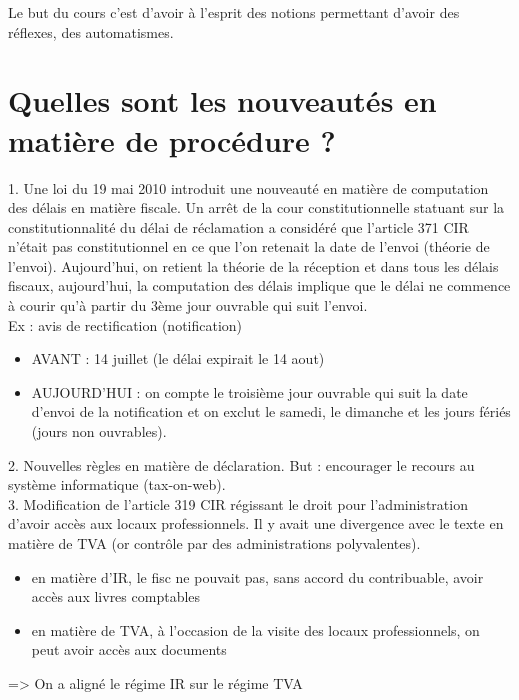 \documentclass{book}
\begin{document}
Le but du cours c’est d’avoir à l’esprit des notions permettant d’avoir des réflexes, des automatismes. \\

\section*{Quelles sont les nouveautés en matière de procédure ?}

1. Une loi du 19 mai 2010 introduit une nouveauté en matière de computation des délais en matière fiscale. Un arrêt de la cour constitutionnelle statuant sur la constitutionnalité du délai de réclamation a considéré que l’article 371 CIR n’était pas constitutionnel en ce que l’on retenait la date de l’envoi (théorie de l’envoi). Aujourd’hui, on retient la théorie de la réception et dans tous les délais fiscaux, aujourd’hui, la computation des délais implique que le délai ne commence à courir qu’à partir du 3ème jour ouvrable qui suit l’envoi. \\

Ex : avis de rectification (notification)
\begin{itemize}
\item AVANT : 14 juillet (le délai expirait le 14 aout)
\item AUJOURD’HUI : on compte le troisième jour ouvrable qui suit la date d’envoi de la notification et on exclut le samedi, le dimanche et les jours fériés (jours non ouvrables). 
\end{itemize}

2. Nouvelles règles en matière de déclaration. But : encourager le recours au système informatique (tax-on-web). \\

3. Modification de l’article 319 CIR régissant le droit pour l’administration d’avoir accès aux locaux professionnels. Il y avait une divergence avec le texte en matière de TVA (or contrôle par des administrations polyvalentes). \\

\begin{itemize}
\item en matière d’IR, le fisc ne pouvait pas, sans accord du contribuable, avoir accès aux livres comptables 
\item en matière de TVA, à l’occasion de la visite des locaux professionnels, on peut avoir accès aux documents 
\end{itemize}
=> On a aligné le régime IR sur le régime TVA\\
\end{document}
